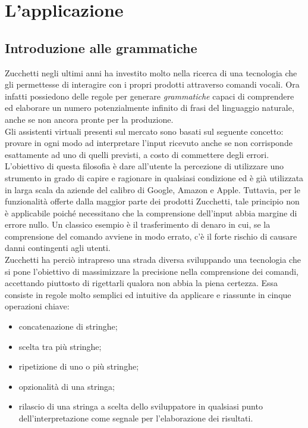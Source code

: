 
\chapter{L'applicazione}
\label{cap:applicazione}


\section{Introduzione alle grammatiche}
Zucchetti negli ultimi anni ha investito molto nella ricerca di una tecnologia che gli permettesse di interagire con i propri prodotti attraverso comandi vocali. Ora infatti possiedono delle regole per generare \emph{grammatiche} capaci di comprendere ed elaborare un numero potenzialmente infinito di frasi del linguaggio naturale, anche se non ancora pronte per la produzione. \\
Gli assistenti virtuali presenti sul mercato sono basati sul seguente concetto: provare in ogni modo ad interpretare l'input ricevuto anche se non corrisponde esattamente ad uno di quelli previsti, a costo di commettere degli errori. L'obiettivo di questa filosofia è dare all'utente la percezione di utilizzare uno strumento in grado di capire e ragionare in qualsiasi condizione ed è già utilizzata in larga scala da aziende del calibro di Google, Amazon e Apple. Tuttavia, per le funzionalità offerte dalla maggior parte dei prodotti Zucchetti, tale principio non è applicabile poiché necessitano che la comprensione dell'input abbia margine di errore nullo. Un classico esempio è il trasferimento di denaro in cui, se la comprensione del comando avviene in modo errato, c'è il forte rischio di causare danni contingenti agli utenti. \\
Zucchetti ha perciò intrapreso una strada diversa sviluppando una tecnologia che si pone l'obiettivo di massimizzare la precisione nella comprensione dei comandi, accettando piuttosto di rigettarli qualora non abbia la piena certezza. Essa consiste in regole molto semplici ed intuitive da applicare e riassunte in cinque operazioni chiave:
\begin{itemize}
	\item concatenazione di stringhe;
	\item scelta tra più stringhe;
	\item ripetizione di uno o più stringhe;
	\item opzionalità di una stringa;
	\item rilascio di una stringa a scelta dello sviluppatore in qualsiasi punto dell'interpretazione come segnale per l'elaborazione dei risultati.
\end{itemize}
